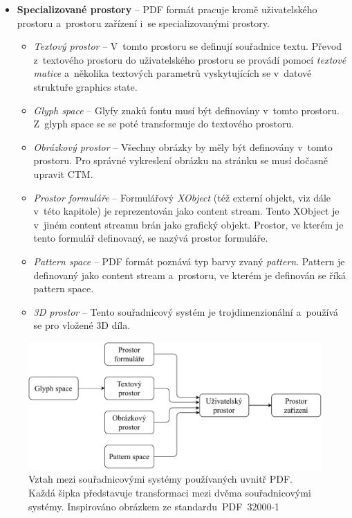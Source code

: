 \begin{itemize}
    \item \textbf{Specializované prostory} -- PDF formát pracuje kromě
    uživatelského prostoru a~prostoru zařízení i~se specializovanými prostory.
    \begin{itemize}
        \item \emph{Textový prostor} -- V~tomto prostoru se definují souřadnice
        textu. Převod z~textového prostoru do uživatelského prostoru se provádí
        pomocí \emph{textové matice} a~několika textových parametrů vyskytujících
        se v~datové struktuře graphics state.

        \item \emph{Glyph space} -- Glyfy znaků fontu musí být definovány v~tomto
        prostoru. Z~glyph space se se poté transformuje do textového prostoru.
        
        \item \emph{Obrázkový prostor} -- Všechny obrázky by měly být definovány
        v~tomto prostoru. Pro správné vykreslení obrázku na stránku se musí dočasně
        upravit CTM.

        \item \emph{Prostor formuláře} -- Formulářový \emph{XObject} (též externí
        objekt, viz dále v~této kapitole) je
        reprezentován jako content stream. Tento XObject je v~jiném content streamu
        brán jako grafický objekt. Prostor, ve kterém je tento formulář definovaný,
        se nazývá prostor formuláře.

        \item \emph{Pattern space} -- PDF formát poznává typ barvy zvaný
        \emph{pattern}. Pattern je definovaný jako content stream a~prostoru, ve
        kterém je definován se říká pattern space.
        
        \item \emph{3D prostor} -- Tento souřadnicový systém je
        trojdimenzionální a~používá se pro vložené 3D díla.
    \end{itemize}
\end{itemize}

\begin{figure}[H]
    \label{coordinate_spaces}
    \includegraphics[width=\linewidth]{obrazky-figures/coordinate_spaces.pdf}
    \caption[Vztah mezi souřadnicovými systémy používaných uvnitř PDF]{Vztah mezi souřadnicovými systémy používaných uvnitř PDF. Každá šipka představuje transformaci mezi dvěma souřadnicovými systémy. Inspirováno obrázkem ze standardu~PDF~32000-1~\cite{PDF32000-1:2008}}
\end{figure}


